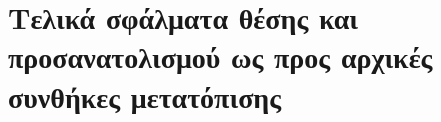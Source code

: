 \section{Τελικά σφάλματα θέσης και προσανατολισμού ως προς αρχικές συνθήκες μετατόπισης}
  \label{appendix:05:pos_orient_errors}
  
